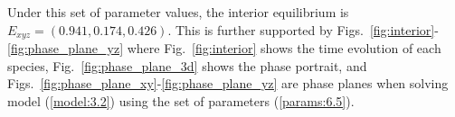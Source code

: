 Under this set of parameter values, the interior equilibrium is $E_{xyz}=(0.941,0.174,0.426)$. This is further supported by Figs.~\ref{fig:interior}-\ref{fig:phase_plane_yz} where Fig.~\ref{fig:interior} shows the time evolution of each species, Fig.~\ref{fig:phase_plane_3d} shows the phase portrait, and Figs.~\ref{fig:phase_plane_xy}-\ref{fig:phase_plane_yz} are phase planes when solving model (\ref{model:3.2}) using the set of parameters (\ref{params:6.5}).